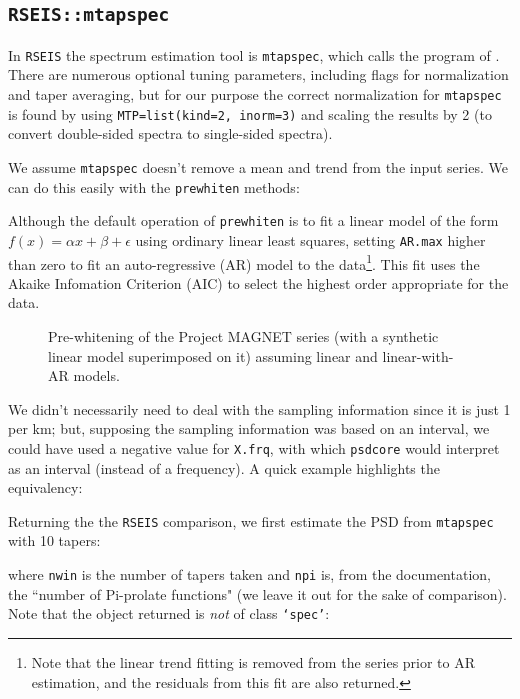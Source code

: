 \documentclass[10pt]{article}\usepackage[]{graphicx}\usepackage[]{color}
\newcommand{\Rcmd}[1]{\texttt{#1}}
\begin{document}
\subsection{\Rcmd{RSEIS::mtapspec}}

In \Rcmd{RSEIS} the spectrum estimation tool is \Rcmd{mtapspec}, which
calls the program of \citet{lees1995}.
There are numerous optional tuning parameters, including
flags for normalization and taper averaging, but 
for our purpose the correct normalization for \Rcmd{mtapspec} is found
by using \Rcmd{MTP=list(kind=2, inorm=3)} and scaling the results by 2 (to convert
double-sided spectra to single-sided spectra).

We assume \Rcmd{mtapspec} doesn't remove a mean and trend from the
input series.  We can do this easily with the \Rcmd{prewhiten} methods:


Although the default operation of  \Rcmd{prewhiten} is to fit a linear model of the form 
$f(x) = \alpha x + \beta + \epsilon$ using ordinary linear least squares,
setting \Rcmd{AR.max} higher than zero to fit an auto-regressive (AR) model to the 
data\footnote{Note that the linear trend fitting is removed from the series prior to AR estimation,
and the residuals from this fit are also returned.}.  
This fit uses the Akaike Infomation Criterion (AIC) to select
the highest order appropriate for the data.


\label{sxn:prew}

\begin{figure}[!htbp]
\begin{center}

\caption{Pre-whitening of the Project MAGNET series (with a
synthetic linear model superimposed on it) assuming linear and linear-with-AR models.
}
\label{fig:magd}
\end{center}
\end{figure}

\clearpage

We didn't necessarily need to deal with the sampling information since it is just 1 per km;
but, supposing the sampling information was based on an interval, we could have used
a negative value for \Rcmd{X.frq}, with which \Rcmd{psdcore}
would interpret as an interval (instead of a frequency). 
A quick example highlights the equivalency:


Returning the the \Rcmd{RSEIS} comparison, we first 
estimate the PSD from \Rcmd{mtapspec} with 10 tapers:

where \Rcmd{nwin} is the number of tapers taken and
\Rcmd{npi} is, from the documentation, the ``number of Pi-prolate functions" (we
leave it out for the sake of comparison). Note that the object returned
is \emph{not} of class \Rcmd{`spec'}:

\end{document}
